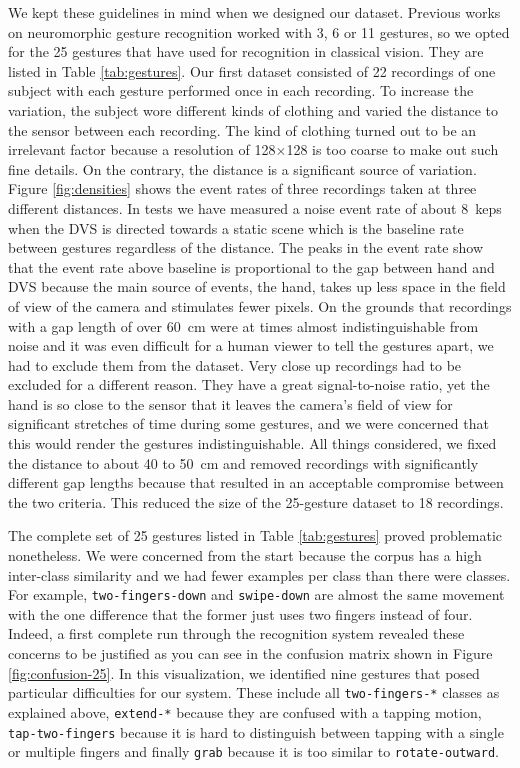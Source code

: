 We kept these guidelines in mind when we designed our dataset. Previous works on
neuromorphic gesture recognition worked with 3, 6 or 11 gestures, so we opted
for the 25 gestures that \cite{molchanov2016online} have used for recognition in
classical vision. They are listed in Table \ref{tab:gestures}. Our first dataset
consisted of 22 recordings of one subject with each gesture performed once in
each recording. To increase the variation, the subject wore different kinds of
clothing and varied the distance to the sensor between each recording. The kind
of clothing turned out to be an irrelevant factor because a resolution of
128$\times$128 is too coarse to make out such fine details. On the contrary, the
distance is a significant source of variation. Figure \ref{fig:densities} shows
the event rates of three recordings taken at three different distances. In tests
we have measured a noise event rate of about \SI{8}{keps} when the DVS is
directed towards a static scene which is the baseline rate between gestures
regardless of the distance. The peaks in the event rate show that the event rate
above baseline is proportional to the gap between hand and DVS because the main
source of events, the hand, takes up less space in the field of view of the
camera and stimulates fewer pixels. On the grounds that recordings with a gap
length of over \SI{60}{\centi\meter} were at times almost indistinguishable from
noise and it was even difficult for a human viewer to tell the gestures apart,
we had to exclude them from the dataset. Very close up recordings had to be
excluded for a different reason. They have a great signal-to-noise ratio, yet
the hand is so close to the sensor that it leaves the camera's field of view for
significant stretches of time during some gestures, and we were concerned that
this would render the gestures indistinguishable. All things considered, we
fixed the distance to about \SI{40}{} to \SI{50}{\centi\meter} and removed
recordings with significantly different gap lengths because that resulted in an
acceptable compromise between the two criteria. This reduced the size of the
25-gesture dataset to 18 recordings.

The complete set of 25 gestures listed in Table \ref{tab:gestures} proved
problematic nonetheless. We were concerned from the start because the corpus has
a high inter-class similarity and we had fewer examples per class than there
were classes. For example, \texttt{two-fingers-down} and \texttt{swipe-down} are
almost the same movement with the one difference that the former just uses two
fingers instead of four. Indeed, a first complete run through the recognition
system revealed these concerns to be justified as you can see in the confusion
matrix shown in Figure \ref{fig:confusion-25}. In this visualization, we
identified nine gestures that posed particular difficulties for our system.
These include all \texttt{two-fingers-*} classes as explained above,
\texttt{extend-*} because they are confused with a tapping motion,
\texttt{tap-two-fingers} because it is hard to distinguish between tapping with
a single or multiple fingers and finally \texttt{grab} because it is too similar
to \texttt{rotate-outward}.

